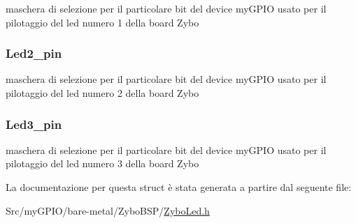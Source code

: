 maschera di selezione per il particolare bit del device my\+G\+P\+I\+O usato per il pilotaggio del led numero 1 della board Zybo \hypertarget{struct_zybo_led__t_a4213c78e5a02b1476222e989c2eceb04}{
\subsubsection[{Led2\+\_\+pin}]{ Led2\+\_\+pin}}\label{struct_zybo_led__t_a4213c78e5a02b1476222e989c2eceb04}
maschera di selezione per il particolare bit del device my\+G\+P\+I\+O usato per il pilotaggio del led numero 2 della board Zybo \hypertarget{struct_zybo_led__t_afc64d1407f30615e374bf9f06721842a}{
\subsubsection[{Led3\+\_\+pin}]{ Led3\+\_\+pin}}\label{struct_zybo_led__t_afc64d1407f30615e374bf9f06721842a}
maschera di selezione per il particolare bit del device my\+G\+P\+I\+O usato per il pilotaggio del led numero 3 della board Zybo 

La documentazione per questa struct è stata generata a partire dal seguente file\+:\begin{DoxyCompactItemize}
\item 
Src/my\+G\+P\+I\+O/bare-\/metal/\+Zybo\+B\+S\+P/\hyperlink{_zybo_led_8h}{Zybo\+Led.\+h}\end{DoxyCompactItemize}
